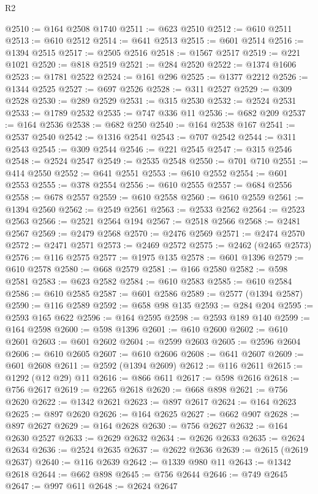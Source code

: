 \begin{lexlean}{R2}
\begin{coremodule}
@2510 := @164 @2508 @1740
@2511 := @623 @2510
@2512 := @610 @2511
@2513 := @610 @2512
@2514 := @641 @2513
@2515 := @601 @2514
@2516 := @1394 @2515
@2517 := @2505 @2516
@2518 := @1567 @2517
@2519 := @221 @1021
@2520 := @818 @2519
@2521 := @284 @2520
@2522 := @1374 @1606
@2523 := @1781 @2522
@2524 := @161 @296
@2525 := @1377 @2212
@2526 := @1344 @2525
@2527 := @697 @2526
@2528 := @311 @2527
@2529 := @309 @2528
@2530 := @289 @2529
@2531 := @315 @2530
@2532 := @2524 @2531
@2533 := @1789 @2532
@2535 := @747 @336 @11
@2536 := @682 @209
@2537 := @164 @2536
@2538 := @682 @250
@2540 := @164 @2538 @167
@2541 := @2537 @2540
@2542 := @1316 @2541
@2543 := @707 @2542
@2544 := @311 @2543
@2545 := @309 @2544
@2546 := @221 @2545
@2547 := @315 @2546
@2548 := @2524 @2547
@2549 := @2535 @2548
@2550 := @701 @710
@2551 := @414 @2550
@2552 := @641 @2551
@2553 := @610 @2552
@2554 := @601 @2553
@2555 := @378 @2554
@2556 := @610 @2555
@2557 := @684 @2556
@2558 := @678 @2557
@2559 := @610 @2558
@2560 := @610 @2559
@2561 := @1394 @2560
@2562 := @2549 @2561
@2563 := @2533 @2562
@2564 := @2523 @2563
@2566 := @2521 @2564 @194
@2567 := @2518 @2566
@2568 := @2481 @2567
@2569 := @2479 @2568
@2570 := @2476 @2569
@2571 := @2474 @2570
@2572 := @2471 @2571
@2573 := @2469 @2572
@2575 := @2462 (@2465 @2573)
@2576 := @116 @2575
@2577 := @1975 @135
@2578 := @601 @1396
@2579 := @610 @2578
@2580 := @668 @2579
@2581 := @166 @2580
@2582 := @598 @2581
@2583 := @623 @2582
@2584 := @610 @2583
@2585 := @610 @2584
@2586 := @610 @2585
@2587 := @601 @2586
@2589 := @2577 (@1394 @2587)
@2590 := @116 @2589
@2592 := @658 @98 @135
@2593 := @284 @204
@2595 := @2593 @165 @622
@2596 := @164 @2595
@2598 := @2593 @189 @140
@2599 := @164 @2598
@2600 := @598 @1396
@2601 := @610 @2600
@2602 := @610 @2601
@2603 := @601 @2602
@2604 := @2599 @2603
@2605 := @2596 @2604
@2606 := @610 @2605
@2607 := @610 @2606
@2608 := @641 @2607
@2609 := @601 @2608
@2611 := @2592 (@1394 @2609)
@2612 := @116 @2611
@2615 := @1292 (@12 @29) @11
@2616 := @866 @611
@2617 := @598 @2616
@2618 := @756 @2617
@2619 := @2265 @2618
@2620 := @668 @898
@2621 := @756 @2620
@2622 := @1342 @2621
@2623 := @897 @2617
@2624 := @164 @2623
@2625 := @897 @2620
@2626 := @164 @2625
@2627 := @662 @907
@2628 := @897 @2627
@2629 := @164 @2628
@2630 := @756 @2627
@2632 := @164 @2630 @2527
@2633 := @2629 @2632
@2634 := @2626 @2633
@2635 := @2624 @2634
@2636 := @2524 @2635
@2637 := @2622 @2636
@2639 := @2615 (@2619 @2637)
@2640 := @116 @2639
@2642 := @1339 @980 @11
@2643 := @1342 @2618
@2644 := @662 @898
@2645 := @756 @2644
@2646 := @749 @2645
@2647 := @997 @611
@2648 := @2624 @2647

\end{coremodule}
\end{lexlean}
